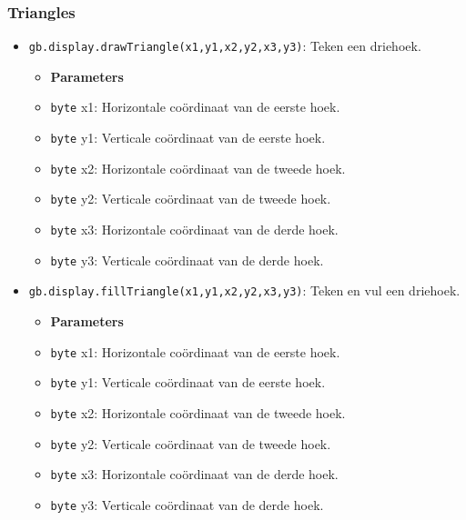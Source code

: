 \documentclass[a4paper,titlepage,12pt]{article}
\begin{document}
	\subsubsection{Triangles}
	\begin{itemize}
		\item \texttt{gb.display.drawTriangle(x1,y1,x2,y2,x3,y3)}: Teken een driehoek.
		\begin{itemize}
			\item [] \textbf{Parameters}
			\item \texttt{byte} x1: Horizontale coördinaat van de eerste hoek.
			\item \texttt{byte} y1: Verticale coördinaat van de eerste hoek.
			\item \texttt{byte} x2: Horizontale coördinaat van de tweede hoek.
			\item \texttt{byte} y2: Verticale coördinaat van de tweede hoek.
			\item \texttt{byte} x3: Horizontale coördinaat van de derde hoek.
			\item \texttt{byte} y3: Verticale coördinaat van de derde hoek.
		\end{itemize}
	
		\item \texttt{gb.display.fillTriangle(x1,y1,x2,y2,x3,y3)}: Teken en vul een driehoek.
		\begin{itemize}
			\item [] \textbf{Parameters}
			\item \texttt{byte} x1: Horizontale coördinaat van de eerste hoek.
			\item \texttt{byte} y1: Verticale coördinaat van de eerste hoek.
			\item \texttt{byte} x2: Horizontale coördinaat van de tweede hoek.
			\item \texttt{byte} y2: Verticale coördinaat van de tweede hoek.
			\item \texttt{byte} x3: Horizontale coördinaat van de derde hoek.
			\item \texttt{byte} y3: Verticale coördinaat van de derde hoek.
		\end{itemize}
	\end{itemize}
\end{document}
